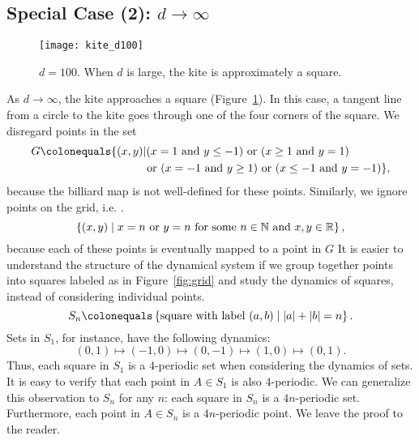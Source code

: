 \documentclass[12pt,twoside]{book}
\begin{document}
\subsection*{Special Case (2): $d \to \infty$}
\begin{figure}[ht]
  \begin{center}
    \texttt{[image: kite\_d100]}
    \caption{$d = 100$. When $d$ is large, the kite is approximately a square.}
    \label{fig:kite-square}
  \end{center}
\end{figure}
As $d \to \infty$, the kite approaches a square (Figure~\ref{fig:kite-square}).
In this case, a tangent line from a circle to the kite goes through one of the four corners of the square.
We disregard points in the set 
\begin{align*}
  G \ceq \{(x,y) &|
    (x = 1 \mbox{ and } y \leq -1) 
    \mbox{ or }
    (x \geq 1 \mbox{ and } y = 1)  \\
    &\mbox{ or }
    (x = -1 \mbox{ and } y \geq 1) 
    \mbox{ or }
    (x \leq -1 \mbox{ and } y = -1) 
  \},
\end{align*}
 because the billiard map is not well-defined for these points.
Similarly, we ignore points on the grid, i.e. .
\begin{equation*}
  \left \{ (x,y) \mathrel{} \middle| \mathrel{} x = n \mbox{ or } y = n \mbox{ for some } n \in \mathbb{N} \mbox{ and } x,y \in \mathbb{R} \right \},
\end{equation*}
because each of these points is eventually mapped to a point in $G$
It is easier to understand the structure of the dynamical system if we group together points into squares labeled as in Figure~\ref{fig:grid} and study the dynamics of squares, instead of considering individual points.
\begin{equation*}
  S_n \ceq \setst{\mbox{square with label } (a,b)}{\abs{a} + \abs{b} = n}.
\end{equation*}
Sets in $S_1$, for instance, have the following dynamics:
\begin{equation*}
  (0,1) \mapsto (-1,0) \mapsto (0,-1) \mapsto (1,0) \mapsto (0,1).
\end{equation*}
Thus, each square in $S_1$ is a 4-periodic set when considering the dynamics of sets.
It is easy to verify that each point in $A \in S_1$ is also $4$-periodic.
We can generalize this observation to $S_n$ for any $n$: each square in $S_n$ is a $4n$-periodic set.
Furthermore, each point in $A \in S_n$ is a $4n$-periodic point.
We leave the proof to the reader.
\end{document}
